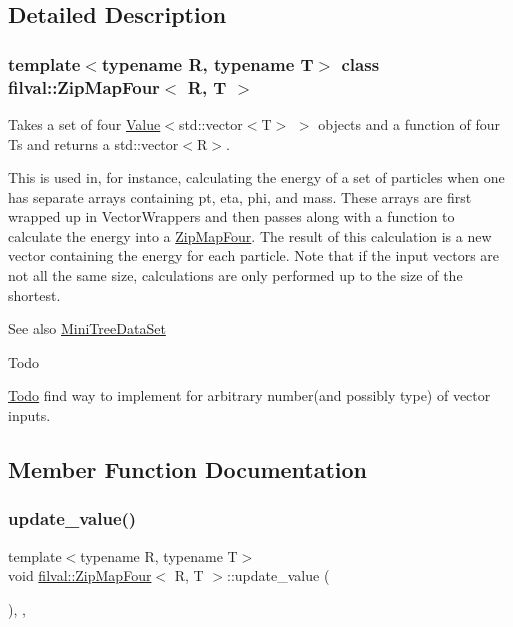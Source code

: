\subsection{Detailed Description}
\subsubsection*{template$<$typename R, typename T$>$\newline
class filval\+::\+Zip\+Map\+Four$<$ R, T $>$}

Takes a set of four \hyperlink{classfilval_1_1Value}{Value}$<$std\+::vector$<$\+T$>$ $>$ objects and a function of four Ts and returns a std\+::vector$<$\+R$>$. 

This is used in, for instance, calculating the energy of a set of particles when one has separate arrays containing pt, eta, phi, and mass. These arrays are first wrapped up in Vector\+Wrappers and then passes along with a function to calculate the energy into a \hyperlink{classfilval_1_1ZipMapFour}{Zip\+Map\+Four}. The result of this calculation is a new vector containing the energy for each particle. Note that if the input vectors are not all the same size, calculations are only performed up to the size of the shortest. \begin{DoxySeeAlso}{See also}
\hyperlink{classMiniTreeDataSet}{Mini\+Tree\+Data\+Set} 
\end{DoxySeeAlso}
\begin{DoxyRefDesc}{Todo}
\item[\hyperlink{todo__todo000002}{Todo}]find way to implement for arbitrary number(and possibly type) of vector inputs. \end{DoxyRefDesc}


\subsection{Member Function Documentation}
\hypertarget{classfilval_1_1ZipMapFour_a0a228a51d603e70af7db4fb27ed1c186}{}\label{classfilval_1_1ZipMapFour_a0a228a51d603e70af7db4fb27ed1c186} 
\subsubsection{\texorpdfstring{update\+\_\+value()}{update\_value()}}
{\footnotesize\ttfamily template$<$typename R, typename T$>$ \\
void \hyperlink{classfilval_1_1ZipMapFour}{filval\+::\+Zip\+Map\+Four}$<$ R, T $>$\+::update\+\_\+value (\begin{DoxyParamCaption}{ }\end{DoxyParamCaption})\hspace{0.3cm}{\ttfamily [inline]}, {\ttfamily [private]}, {\ttfamily [virtual]}}



